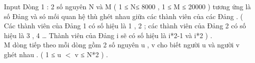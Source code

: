 Input
Dòng 1 : 2 số nguyên N và M ( 1 ≤ N≤ 8000 , 1 ≤ M ≤ 20000 ) tương ứng là số Đảng và só mối quan hệ thù ghét nhau giữa các thành viên của các Đảng . ( Các thành viên của Đảng 1 có số hiệu là 1 , 2 ; các thành viên của Đảng 2 có số hiệu là 3 , 4 … Thành viên của Đảng i sẽ có số hiệu là i*2-1 và i*2 ) .   
\\   M dòng tiếp theo mỗi dòng gồm 2 số nguyên u , v cho biết người u và người v ghét nhau . ( 1 ≤ u $<$ v ≤ N*2 ) .